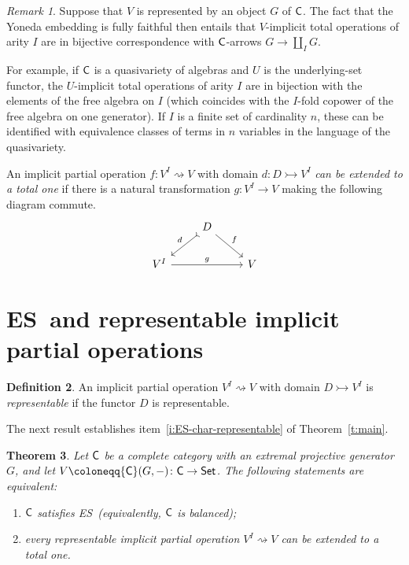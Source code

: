 \documentclass[a4paper,10pt,reqno]{amsart}
\newtheorem{theorem}{Theorem}[section]
\theoremstyle{definition}
\newtheorem{definition}[theorem]{Definition}
\theoremstyle{remark}
\newtheorem{remark}[theorem]{Remark}
\newcommand{\cat}{{\sf C}}								%
\newcommand{\Set}{{\sf Set}}							%
\newcommand{\ES}{\textnormal{ES}}
\begin{document}
\begin{remark}\label{rmk:partial-total-ops}
Suppose that $V$ is represented by an object $G$ of $\cat$. The fact that the Yoneda embedding is fully faithful then entails that $V$-implicit total operations of arity $I$ are in bijective correspondence with $\cat$-arrows $G \to \coprod_{I}{G}$. 

For example, if $\cat$ is a quasivariety of algebras and $U$ is the underlying-set functor, the $U$-implicit total operations of arity $I$ are in bijection with the elements of the free algebra on $I$ (which coincides with the $I$-fold copower of the free algebra on one generator). If $I$ is a finite set of cardinality $n$, these can be identified with equivalence classes of terms in $n$ variables in the language of the quasivariety.
\end{remark}

An implicit partial operation $f\colon V^{I}\rightsquigarrow V$ with domain $d\colon D\rightarrowtail V^{I}$ \emph{can be extended to a total one} if there is a natural transformation $g\colon V^{I}\to V$ making the following diagram commute.
\[\begin{tikzcd}
& D \arrow[rightarrowtail]{dl}[swap]{d} \arrow{dr}{f} & \\
V^{I} \arrow{rr}{g} & & V
\end{tikzcd}\]
%

\section{\ES~and representable implicit partial operations}\label{s:implicit-ES}

\begin{definition}
An implicit partial operation $V^{I} \rightsquigarrow V$ with domain $D\rightarrowtail V^{I}$ is \emph{representable} if the functor $D$ is representable.
\end{definition}

The next result establishes item~\ref{i:ES-char-representable} of Theorem~\ref{t:main}.

\begin{theorem}\label{t:ES-vs-implicit-operations}
Let $\cat$ be a complete category with an extremal projective generator~$G$, and let $V\coloneqq \cat(G,-)\colon\cat\to\Set$. The following statements are equivalent:
%
\begin{enumerate}[label=(\arabic*),series=implicitops]
\item\label{i:Cat-satisfies-ES} $\cat$ satisfies \ES~(equivalently, $\cat$ is balanced);
\item\label{i:representable-admits-extension} every representable implicit partial operation $V^{I} \rightsquigarrow V$ can be extended to a total one.
\end{enumerate}
\end{theorem}
\end{document}
